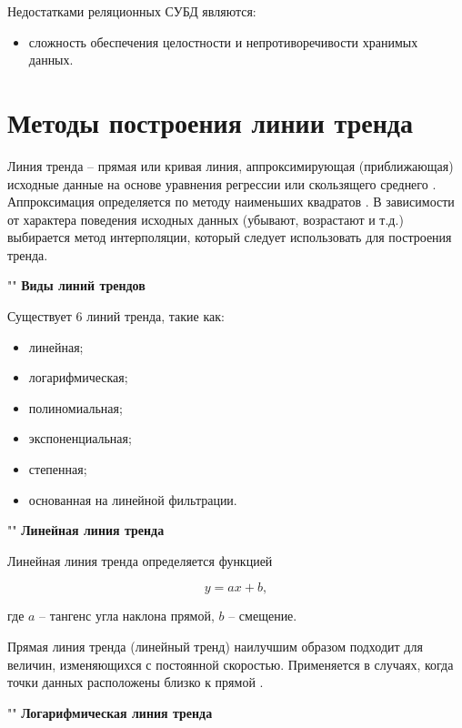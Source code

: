 \documentclass[a4paper]{bmstu}
\begin{document}
Недостатками реляционных СУБД являются:

\begin{itemize}
	\item сложность обеспечения целостности и непротиворечивости хранимых данных.
\end{itemize}


\section{Методы построения линии тренда}

Линия тренда -- прямая или кривая линия, аппроксимирующая (приближающая) исходные данные на основе уравнения регрессии или скользящего среднего \cite{lt-exel}. Аппроксимация определяется по ме­тоду наименьших квадратов \cite{mnk}. В зависимости от характера поведения исходных данных (убыва­ют, возрастают и т.д.) выбирается метод интерполяции, который сле­дует использовать для построения тренда.

""\newline
\noindent\textbf{Виды линий трендов}

Существует 6 линий тренда, такие как:

\begin{itemize}
	\item линейная;
	\item логарифмическая;
	\item полиномиальная;
	\item экспоненциальная;
	\item степенная;
	\item основанная на линейной фильтрации.
\end{itemize}

""\newline
\noindent\textbf{Линейная линия тренда}

Линейная линия тренда определяется функцией

\begin{equation}
	y = ax + b,
\end{equation}

где $a$ -- тангенс угла наклона прямой, $b$ -- смещение.

Прямая линия тренда (линейный тренд) наилучшим образом подходит для величин, изменяющихся с постоянной скоростью. Приме­няется в случаях, когда точки данных расположены близко к прямой \cite{lt-exel}.

""\newline
\noindent\textbf{Логарифмическая линия тренда}
\end{document}
